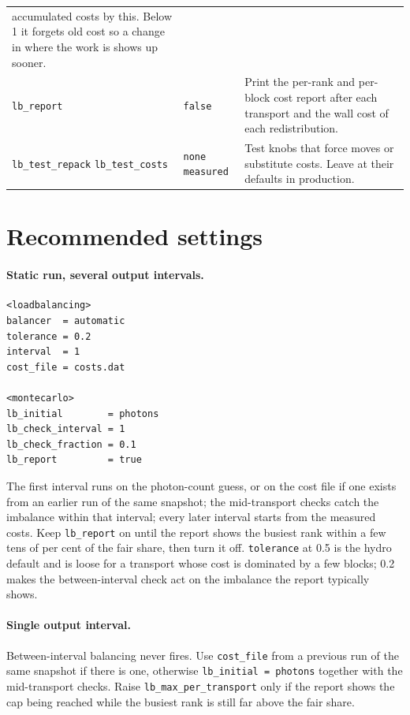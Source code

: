 \documentclass[11pt]{article}
\newcommand{\key}[1]{\texttt{#1}}
\begin{document}
\begin{center}
\begin{tabular}{@{}lp{3.4cm}p{7.4cm}@{}}
  accumulated costs by this. Below 1 it forgets old cost so a change in where the work
  is shows up sooner. \\
\key{lb\_report} & \key{false} & Print the per-rank and per-block cost report after each
  transport and the wall cost of each redistribution. \\
\key{lb\_test\_repack} \newline \key{lb\_test\_costs} & \key{none} \newline \key{measured} & Test
  knobs that force moves or substitute costs. Leave at their defaults in production. \\
\bottomrule
\end{tabular}
\normalsize
\end{center}

\section{Recommended settings}

\paragraph{Static run, several output intervals.}
\begin{verbatim}
<loadbalancing>
balancer  = automatic
tolerance = 0.2
interval  = 1
cost_file = costs.dat

<montecarlo>
lb_initial        = photons
lb_check_interval = 1
lb_check_fraction = 0.1
lb_report         = true
\end{verbatim}
The first interval runs on the photon-count guess, or on the cost file if one exists from
an earlier run of the same snapshot; the mid-transport checks catch the imbalance
within that interval; every later interval starts from the measured costs. Keep
\key{lb\_report} on until the report shows the busiest rank within a few tens of per cent
of the fair share, then turn it off. \key{tolerance} at 0.5 is the hydro default and is
loose for a transport whose cost is dominated by a few blocks; 0.2 makes the
between-interval check act on the imbalance the report typically shows.

\paragraph{Single output interval.}
Between-interval balancing never fires. Use \key{cost\_file} from a previous run of the
same snapshot if there is one, otherwise \key{lb\_initial = photons} together with the
mid-transport checks. Raise \key{lb\_max\_per\_transport} only if the report shows the
cap being reached while the busiest rank is still far above the fair share.
\end{document}
